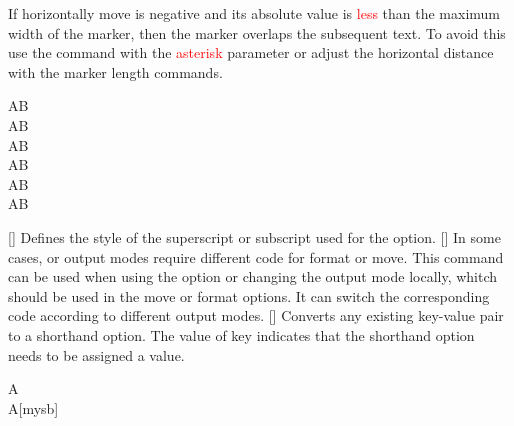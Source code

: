 \documentclass[load-preamble+]{cnltx-doc}
\renewcommand{\emph}[1]{\textcolor{red}{#1}}
\begin{document}
\begin{commands}
  If horizontally move is negative and its absolute value is \emph{less} than the maximum width of the marker, then the marker overlaps the subsequent text. To avoid this use the command with the \emph{asterisk} parameter or adjust the horizontal distance with the marker length commands.
  \begin{example}
  AB \\
  AB \\
  AB \\
  AB \\
  A\hspace{\dimexpr(\llastwd-8pt)}B \\
  A\hspace{\dimexpr(\maxwd-8pt)}B
  \end{example}
  []
  Defines the style of the superscript or subscript used for the  option.
  []
  In some cases,  or  output modes require different code for format or move. This command can be used when using the  option or changing the output mode locally, whitch should be used in the move or format options. It can switch the corresponding code according to different output modes.
  []\newtag%
  Converts any existing key-value pair to a shorthand option. The value of key  indicates that the shorthand option needs to be assigned a value.
  \begin{example}
  A \\
  A[mysb]
  \end{example}
\end{commands}
\end{document}
